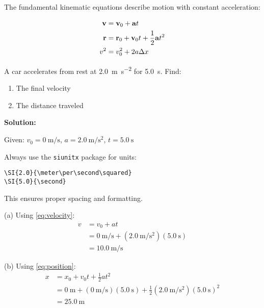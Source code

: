 \documentclass[11pt]{book}
\begin{document}
The fundamental kinematic equations describe motion with constant acceleration:

\begin{align}
    \mathbf{v} &= \mathbf{v}_0 + \mathbf{a}t \label{eq:velocity} \\
    \mathbf{r} &= \mathbf{r}_0 + \mathbf{v}_0 t + \frac{1}{2}\mathbf{a}t^2 \label{eq:position} \\
    v^2 &= v_0^2 + 2a\Delta x \label{eq:velocity-squared}
\end{align}

\begin{problembox}[title=Example Problem 1.1]
A car accelerates from rest at \SI{2.0}{\meter\per\second\squared} for \SI{5.0}{\second}. Find:
\begin{enumerate}[label=(\alph*)]
    \item The final velocity
    \item The distance traveled
\end{enumerate}
\end{problembox}

\textbf{Solution:}

Given: $v_0 = \SI{0}{\meter\per\second}$, $a = \SI{2.0}{\meter\per\second\squared}$, $t = \SI{5.0}{\second}$

\begin{tutorialbox}[title=Using SI Units]
Always use the \texttt{siunitx} package for units:
\begin{verbatim}
\SI{2.0}{\meter\per\second\squared}
\SI{5.0}{\second}
\end{verbatim}
This ensures proper spacing and formatting.
\end{tutorialbox}

(a) Using \cref{eq:velocity}:
\begin{align}
    v &= v_0 + at \\
    &= \SI{0}{\meter\per\second} + (\SI{2.0}{\meter\per\second\squared})(\SI{5.0}{\second}) \\
    &= \SI{10.0}{\meter\per\second}
\end{align}

(b) Using \cref{eq:position}:
\begin{align}
    x &= x_0 + v_0 t + \frac{1}{2}at^2 \\
    &= \SI{0}{\meter} + (\SI{0}{\meter\per\second})(\SI{5.0}{\second}) + \frac{1}{2}(\SI{2.0}{\meter\per\second\squared})(\SI{5.0}{\second})^2 \\
    &= \SI{25.0}{\meter}
\end{align}
\end{document}
